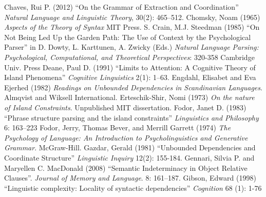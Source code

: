 \documentclass[a4paper]{article}
\begin{document}
Chaves, Rui P. (2012) ``On the Grammar of Extraction and Coordination'' {\it Natural Language and Linguistic Theory}, 30(2): 465–512.
\newline
\newline
Chomsky, Noam (1965) {\it Aspects of the Theory of Syntax}  MIT Press.
\newline
\newline
S. Crain, M.J. Steedman (1985)
``On Not Being Led Up the Garden Path: The Use of Context by the Psychological Parser'' in
D. Dowty, L. Karttunen, A. Zwicky (Eds.) {\it Natural Language Parsing: Psychological, Computational, and Theoretical Perspectives}: 320-358 Cambridge Univ. Press
\newline
\newline
Deane, Paul D. (1991) ``Limits to Attention: A Cognitive Theory
of Island Phenomena''
{\it Cognitive
Linguistics}
2(1): 1–63.
\newline
\newline
Engdahl, Elisabet and Eva Ejerhed (1982) {\it Readings on Unbounded Dependencies in Scandinavian Languages}.  Almqvist and Wiksell International.
\newline
\newline
Erteschik-Shir, Nomi (1973) {\it On the nature of Island Constraints}.  Unpublished MIT dissertation.
\newline
\newline
Fodor, Janet D. (1983) ``Phrase structure parsing and the island constraints''
{\it Linguistics and
Philosophy}
6: 163–223
\newline
\newline
Fodor, Jerry, Thomas Bever, and Merrill Garrett (1974) {\it The Psychology of Language: An Introduction to Psycholinguistics and Generative Grammar}.  McGraw-Hill.
\newline
\newline
Gazdar, Gerald (1981) ``Unbounded Dependencies and Coordinate Structure'' {\it Linguistic Inquiry} 12(2): 155-184.
\newline
\newline
Gennari, Silvia P. and Maryellen C. MacDonald (2008) ``Semantic Indeterminacy in Object Relative Clauses''.  {\it Journal of Memory and Language}.  8: 161–187.
\newline
\newline
Gibson, Edward (1998)
``Linguistic complexity: Locality of syntactic dependencies''
{\it Cognition} 68 (1): 1-76
\newline
\newline
\end{document}

